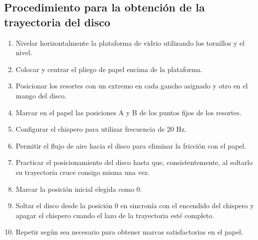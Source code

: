 \documentclass[../main.tex]{subfiles}
\begin{document}
\subsection{Procedimiento para la obtención de la trayectoria del disco}
\begin{enumerate}
  \item Nivelar horizontalmente la plataforma de vidrio utilizando los tornillos y el nivel.
  \item Colocar y centrar el pliego de papel encima de la plataforma.
  \item Posicionar los resortes con un extremo en cada gancho asignado y otro en el mango del disco.
  \item Marcar en el papel las posiciones A y B de los puntos fijos de los resortes.
  \item Configurar el chispero para utilizar frecuencia de 20 Hz.
  \item Permitir el flujo de aire hacia el disco para eliminar la fricción con el papel.
  \item Practicar el posicionamiento del disco hasta que, consistentemente, al soltarlo su trayectoria cruce consigo misma una vez.
  \item Marcar la posición inicial elegida como 0.
  \item Soltar el disco desde la posición 0 en sincronía con el encendido del chispero y apagar el chispero cuando el lazo de la trayectoria esté completo.
  \item Repetir según sea necesario para obtener marcas satisfactorias en el papel.
\end{enumerate}
\end{document}
